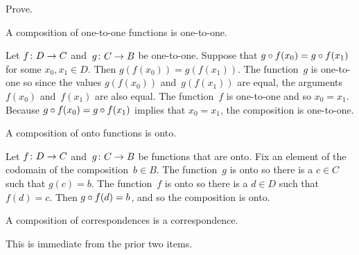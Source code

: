 \documentclass{ibl}  %
\begin{document}
\begin{problem} \label{InteractionOneToONeOntoWithComposition}
Prove.
\begin{exes}
\begin{exercise} 
  A composition of one-to-one functions is one-to-one.
\end{exercise}
\begin{answer}
  Let $\mbox{$f\colon D\to C$}$ and~$\mbox{$g\colon C\to B$}$ be one-to-one.
  Suppose that $g\mathbin{\circ} f(x_0)=g\mathbin{\circ} f(x_1)$ for
  some $x_0,x_1\in D$.
  Then $g(f(x_0))=g(f(x_1))$.
  The function~$g$ is one-to-one so since the values $g(f(x_0))$ 
  and~$g(f(x_1))$ are equal, the arguments $f(x_0)$ and~$f(x_1)$ are
  also equal.
  The function~$f$ is one-to-one and so $x_0=x_1$.
  Because $g\mathbin{\circ} f(x_0)=g\mathbin{\circ} f(x_1)$ implies that
  $x_0=x_1$, the composition is one-to-one.  
\end{answer}
\begin{exercise} 
  A composition of onto functions is onto.
\end{exercise}
\begin{answer}
  Let $\mbox{$f\colon D\to C$}$ and~$\mbox{$g\colon C\to B$}$ be functions that are onto.
  Fix an element of the codomain of the composition~$b\in B$.
  The function~$g$ is onto so there is a $c\in C$ such that $g(c)=b$.
  The function~$f$ is onto so there is a $d\in D$ such that $f(d)=c$.
  Then $g\mathbin{\circ} f(d)=b$, and so the composition is onto.
\end{answer}
\begin{exercise} 
  A composition of correspondences is a correspondence.
\end{exercise}
\begin{answer}
  This is immediate from the prior two items. 
\end{answer}

\end{exes}
\end{problem}
\end{document}
